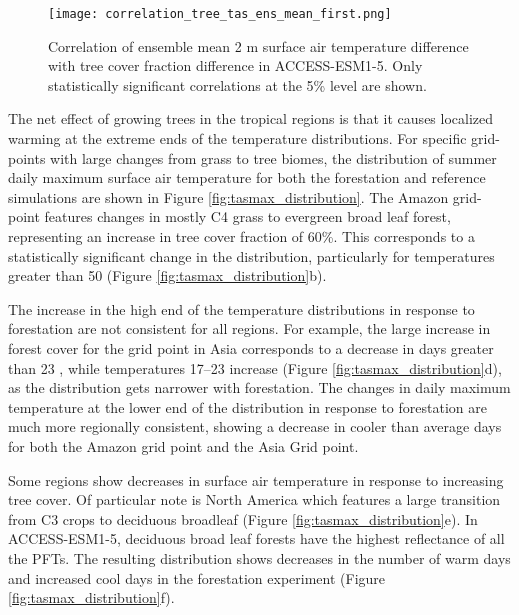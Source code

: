 \documentclass[draft]{agujournal2019}
\begin{document}
\begin{figure}
    \texttt{[image: correlation\_tree\_tas\_ens\_mean\_first.png]}
    \caption{Correlation of ensemble mean 2 m surface air temperature difference  with  tree cover fraction difference  in ACCESS-ESM1-5. Only statistically significant correlations at the 5\% level are shown.}
    \label{fig:map_tas_tree_correlation}
\end{figure}

The net effect of growing trees in the tropical regions is that it causes localized warming at the extreme ends of the temperature distributions.
For specific grid-points with large changes from grass to tree biomes, the distribution of summer daily maximum surface air temperature for both the forestation and reference simulations are shown in Figure \ref{fig:tasmax_distribution}.
The Amazon grid-point features changes in mostly C4 grass to evergreen broad leaf forest, representing an increase in tree cover fraction of 60\%.
This corresponds to a statistically significant change in the distribution, particularly for temperatures greater than 50 \textcelsius{} (Figure \ref{fig:tasmax_distribution}b).

The increase in the high end of the temperature distributions in response to forestation are not consistent for all regions.
For example, the large increase in forest cover for the grid point in Asia corresponds to a decrease in days greater than 23 \textcelsius{}, while temperatures 17--23 \textcelsius{} increase (Figure \ref{fig:tasmax_distribution}d), as the distribution gets narrower with forestation.
The changes in daily maximum temperature at the lower end of the distribution in response to forestation are much more regionally consistent, showing a decrease in cooler than average days for both the Amazon grid point and the Asia Grid point.

Some regions show decreases in surface air temperature in response to increasing tree cover.
Of particular note is North America which features a large transition from C3 crops to deciduous broadleaf (Figure \ref{fig:tasmax_distribution}e).
In ACCESS-ESM1-5, deciduous broad leaf forests have the highest reflectance of all the PFTs.
The resulting distribution shows decreases in the number of warm days and increased cool days in the forestation experiment (Figure \ref{fig:tasmax_distribution}f).
\end{document}
